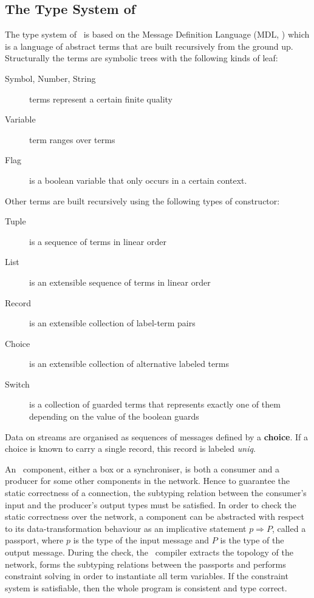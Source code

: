     \subsection*{The Type System of \ak\ }
The type system of \ak\ is based on the Message Definition Language (MDL, \cite{astrakahn}) which is a language of abstract terms that are built recursively from the ground up. Structurally the terms are symbolic trees with the following kinds of leaf:
\begin{description}
\item[Symbol, Number, String] terms represent a certain finite quality
\item[Variable] term ranges over terms
\item[Flag] is a boolean variable that only occurs in a certain context.
\end{description}
Other terms are built recursively using the following types of constructor:
\begin{description}
\item[Tuple] is a sequence of terms in linear order
\item[List] is an extensible sequence of terms in linear order
\item[Record] is an extensible collection of label-term pairs
\item[Choice] is an extensible collection of alternative labeled terms
\item[Switch] is a collection of guarded terms that represents exactly one of them depending on the value of the boolean guards
\end{description}

Data on streams are organised as sequences of messages defined by a \textbf{choice}. If a choice is known to carry a single record, this record is labeled \emph{uniq}.

An \ak\ component, either a box or a synchroniser, is both a consumer and a producer for some other components in the network. Hence to guarantee the static correctness of a connection, the subtyping relation between the consumer's input and the producer's output types must be satisfied. In order to check the static correctness over the network, a component can be abstracted with respect to its data-transformation behaviour as an implicative statement $p \Rightarrow P$, called a passport, where $p$ is the type of the input message and $P$ is the type of the output message. During the check, the \ak\ compiler extracts the topology of the network, forms the subtyping relations between the passports and performs constraint solving in order to instantiate all term variables. If the constraint system is satisfiable, then the whole program is consistent and type correct.


